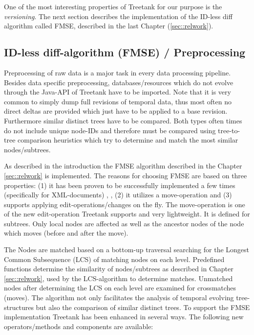 One of the most interesting properties of Treetank for our purpose is the \emph{versioning}. The next section describes the implementation of the ID-less diff algorithm called FMSE, described in the last Chapter (\ref{sec::relwork}).

\subsection{ID-less diff-algorithm (FMSE) / Preprocessing}
Preprocessing of raw data is a major task in every data processing pipeline. Besides data specific preprocessing, databases/resources which do not evolve through the Java-API of Treetank have to be imported. Note that it is very common to simply dump full revisions of temporal data, thus most often no direct deltas are provided which just have to be applied to a base revision. Furthermore similar distinct trees have to be compared. Both types often times do not include unique node-IDs and therefore must be compared using tree-to-tree comparison heuristics which try to determine and match the most similar nodes/subtrees. %

As described in the introduction the FMSE algorithm described in the Chapter \ref{sec::relwork} is implemented. The reasons for choosing FMSE are based on three properties: (1) it has been proven to be successfully implemented a few times (specifically for XML-documents) \cite{xmldiff}, \cite{diffxml}, (2) it utilizes a move-operation and (3) supports applying edit-operations/changes on the fly. The move-operation is one of the new edit-operation Treetank supports and very lightweight. It is defined for subtrees. Only local nodes are affected as well as the ancestor nodes of the node which moves (before and after the move). 

The Nodes are matched based on a bottom-up traversal searching for the Longest Common Subsequence (LCS) of matching nodes on each level. Predefined functions determine the similarity of nodes/subtrees as described in Chapter \ref{sec::relwork}, used by the LCS-algorithm to determine matches. Unmatched nodes after determining the LCS on each level are examined for crossmatches (moves). The algorithm not only facilitates the analysis of temporal evolving tree-structures but also the comparison of similar distinct trees. To support the FMSE implementation Treetank has been enhanced in several ways. The following new operators/methods and components are available:


